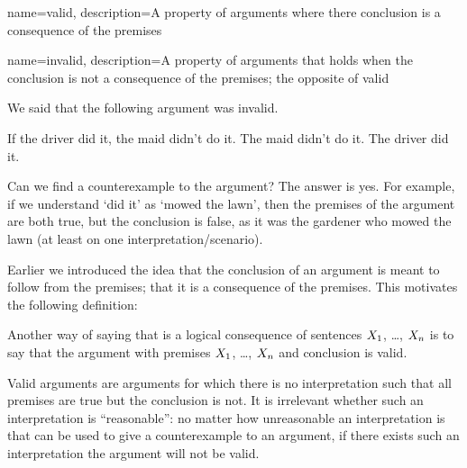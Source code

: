 
{
name=valid,
description={A property of arguments where there conclusion is a consequence of the premises}
}

{
name=invalid,
description={A property of arguments that holds when the conclusion is not a consequence of the premises; the opposite of \gls{valid}}
}

We said that the following argument was invalid.	
\begin{earg}\label{argMaidDriver}
	\prem If the driver did it, the maid didn't do it.
	\prem The maid didn't do it.
	\conc The driver did it.
\end{earg}	
Can we find a counterexample to the argument? The answer is yes. For example, if we understand `did it' as `mowed the lawn', then the premises of the argument are both true, but the conclusion is false, as it was the gardener who mowed the lawn (at least on one interpretation/scenario).

Earlier we introduced the idea that the conclusion of an argument is meant to follow from the premises; that it is a consequence of the premises. This motivates the following definition:


Another way of saying that  \metaY is a logical consequence of sentences $X_1$, \dots, $X_n$ is to say that the argument with premises $X_1$, \dots, $X_n$ and conclusion \metaY is valid.

Valid arguments are arguments for which there is no interpretation such that all premises are true but the conclusion is not. It is irrelevant whether such an interpretation is ``reasonable'': no matter how unreasonable an interpretation is that can be used to give a counterexample to an argument, if there exists such an interpretation the argument will not be valid.

